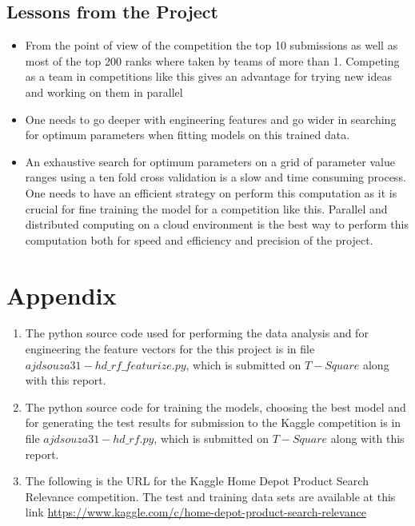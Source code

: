 \documentclass[twoside,12pt]{article}
\begin{document}
\subsection{Lessons from the Project}
\begin{itemize}
	\item
	From the point of view of the competition the top 10 submissions as well as most of the top 200 ranks where taken by teams of more than 1. Competing as a team in competitions like this gives an advantage for trying new ideas and working on them in parallel
	\item
	One needs to go deeper with engineering features and go wider in searching for optimum parameters when fitting models on this trained data. 
	\item
	An exhaustive search for optimum parameters on a grid of parameter value ranges using a ten fold cross validation is a slow and time consuming process. One needs to have an efficient strategy on perform this computation as it is crucial for fine training the model for a competition like this. Parallel and distributed computing on a cloud environment is the best way to perform this computation both for speed and efficiency and precision of the project.
\end{itemize}

\FloatBarrier
\section{Appendix}
\label{Appendix}
\begin{enumerate}
\item
The python source code used for performing the data analysis and for engineering the feature vectors for the this project is in file $ajdsouza31-hd\_rf\_featurize.py$, which is submitted on $T-Square$ along with this report.
\item
The python source code for training the models, choosing the best model and for generating the test results for submission to the Kaggle competition is in file $ajdsouza31-hd\_rf.py$, which is submitted on $T-Square$ along with this report.
\item
The following is the URL for the Kaggle Home Depot Product Search Relevance competition. The test and training data sets are available at this link
\url{https://www.kaggle.com/c/home-depot-product-search-relevance}
\end{enumerate}
\end{document}
